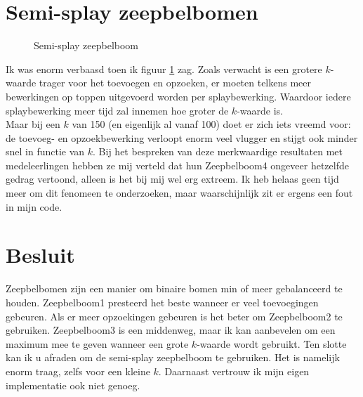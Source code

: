 \documentclass[12pt,hidelinks]{article}
\begin{document}
    \section*{Semi-splay zeepbelbomen}
    \begin{figure}[H]
        \caption{Semi-splay zeepbelboom}
        \label{figSemi}
    \end{figure}
    Ik was enorm verbaasd toen ik figuur \ref{figSemi} zag. 
    Zoals verwacht is een grotere $k$-waarde trager voor het toevoegen en opzoeken, er moeten telkens meer bewerkingen op toppen uitgevoerd worden per splaybewerking.
    Waardoor iedere splaybewerking meer tijd zal innemen hoe groter de $k$-waarde is.
    \\
    Maar bij een $k$ van 150 (en eigenlijk al vanaf 100) doet er zich iets vreemd voor: de toevoeg- en opzoekbewerking verloopt enorm veel vlugger en stijgt ook minder snel in functie van $k$.
    Bij het bespreken van deze merkwaardige resultaten met medeleerlingen hebben ze mij verteld dat hun Zeepbelboom4 ongeveer hetzelfde gedrag vertoond, alleen is het bij mij wel erg extreem.
    Ik heb helaas geen tijd meer om dit fenomeen te onderzoeken, maar waarschijnlijk zit er ergens een fout in mijn code.
    \section*{Besluit}
    Zeepbelbomen zijn een manier om binaire bomen min of meer gebalanceerd te houden. Zeepbelboom1 presteerd het beste wanneer er veel toevoegingen gebeuren.
    Als er meer opzoekingen gebeuren is het beter om Zeepbelboom2 te gebruiken.
    Zeepbelboom3 is een middenweg, maar ik kan aanbevelen om een maximum mee te geven wanneer een grote $k$-waarde wordt gebruikt.
    Ten slotte kan ik u afraden om de semi-splay zeepbelboom te gebruiken. Het is namelijk enorm traag, zelfs voor een kleine $k$. Daarnaast vertrouw ik mijn eigen implementatie ook niet genoeg.
    
\end{document}
